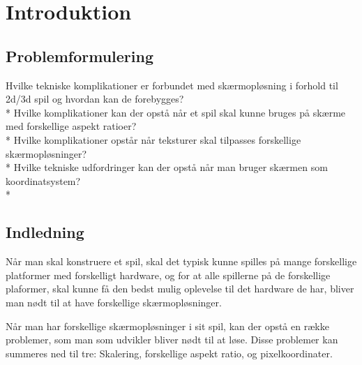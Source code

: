 \documentclass[Main.tex]{introduktion}
\begin{document}
\chapter{Introduktion}

			
\section{Problemformulering}
Hvilke tekniske komplikationer er forbundet med skærmopløsning i forhold til 2d/3d spil og hvordan kan de forebygges?\\*
Hvilke komplikationer kan der opstå når et spil skal kunne bruges på skærme med forskellige aspekt ratioer?\\*
Hvilke komplikationer opstår når teksturer skal tilpasses forskellige skærmopløsninger?\\*
Hvilke tekniske udfordringer kan der opstå når man bruger skærmen som koordinatsystem?\\*
		
\section{Indledning}

Når man skal konstruere et spil, skal det typisk kunne spilles på mange forskellige platformer med forskelligt hardware, og for at alle spillerne på de forskellige plaformer, skal kunne få den bedst mulig oplevelse til det hardware de har, bliver man nødt til at have forskellige skærmopløsninger.

Når man har forskellige skærmopløsninger i sit spil, kan der opstå en række problemer, som man som udvikler bliver nødt til at løse. Disse problemer kan summeres ned til tre: Skalering, forskellige aspekt ratio, og pixelkoordinater.		
	
\end{document}
